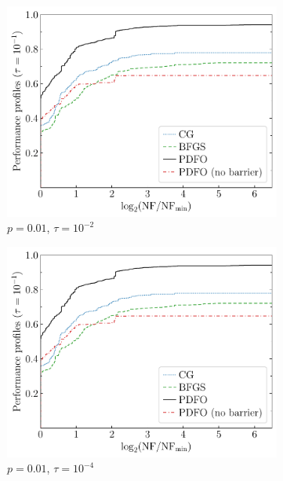 \documentclass[
    smallextended,  %
    final,          %
]{svjour3}
\begin{document}
\begin{figure}[htbp]
    \begin{subfigure}{.48\textwidth}
        \centering
        \includegraphics[width=\textwidth,page=2]{perf-nan-bfgs_cg_pdfo-50-10-0.01.pdf}
        \caption{$p = 0.01$, $\tau = 10^{-2}$}
    \end{subfigure}
    \hfill
    \begin{subfigure}{.48\textwidth}
        \centering
        \includegraphics[width=\textwidth,page=4]{perf-nan-bfgs_cg_pdfo-50-10-0.01.pdf}
        \caption{$p = 0.01$, $\tau = 10^{-4}$}
    \end{subfigure}
    \hfill
    \begin{subfigure}{.48\textwidth}

\end{subfigure}
\end{figure}
\end{document}
